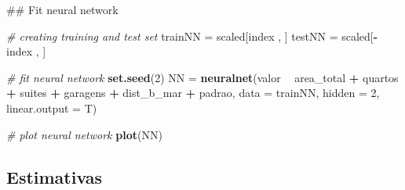 \documentclass[a4paper, 12pt]{article}
\newenvironment{Shaded}{\begin{snugshade}}{\end{snugshade}}
\newcommand{\KeywordTok}[1]{\textcolor[rgb]{0.13,0.29,0.53}{\textbf{#1}}}
\newcommand{\DataTypeTok}[1]{\textcolor[rgb]{0.13,0.29,0.53}{#1}}
\newcommand{\DecValTok}[1]{\textcolor[rgb]{0.00,0.00,0.81}{#1}}
\newcommand{\StringTok}[1]{\textcolor[rgb]{0.31,0.60,0.02}{#1}}
\newcommand{\CommentTok}[1]{\textcolor[rgb]{0.56,0.35,0.01}{\textit{#1}}}
\newcommand{\OperatorTok}[1]{\textcolor[rgb]{0.81,0.36,0.00}{\textbf{#1}}}
\newcommand{\NormalTok}[1]{#1}
\begin{document}
\begin{Shaded}
\begin{Highlighting}[]
\NormalTok{## Fit neural network }

\CommentTok{# creating training and test set}
\NormalTok{trainNN =}\StringTok{ }\NormalTok{scaled[index , ]}
\NormalTok{testNN =}\StringTok{ }\NormalTok{scaled[}\OperatorTok{-}\NormalTok{index , ]}

\CommentTok{# fit neural network}
\KeywordTok{set.seed}\NormalTok{(}\DecValTok{2}\NormalTok{)}
\NormalTok{NN =}\StringTok{ }\KeywordTok{neuralnet}\NormalTok{(valor }\OperatorTok{~}\StringTok{ }\NormalTok{area_total }\OperatorTok{+}\StringTok{ }\NormalTok{quartos }\OperatorTok{+}\StringTok{ }\NormalTok{suites }\OperatorTok{+}\StringTok{ }\NormalTok{garagens }\OperatorTok{+}\StringTok{ }
\StringTok{                 }\NormalTok{dist_b_mar }\OperatorTok{+}\StringTok{ }\NormalTok{padrao, }
               \DataTypeTok{data =}\NormalTok{ trainNN, }\DataTypeTok{hidden =} \DecValTok{2}\NormalTok{, }\DataTypeTok{linear.output =}\NormalTok{ T)}

\CommentTok{# plot neural network}
\KeywordTok{plot}\NormalTok{(NN)}
\end{Highlighting}
\end{Shaded}

\subsection{Estimativas}\label{estimativas}

\begin{Shaded}
\end{Shaded}
\end{document}
